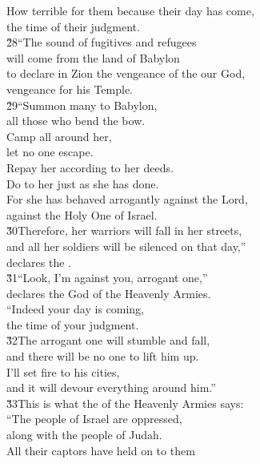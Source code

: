 \begin{poetry}
\poeml How terrible for them because their day has come, \\
\poemll    the time of their judgment. \\
\poeml \v{28}``The sound of fugitives and refugees \\
\poemll    will come from the land of Babylon \\
\poeml to declare in Zion the vengeance of the  our God, \\
\poemll    vengeance for his Temple. \\
\poeml \v{29}``Summon many to Babylon, \\
\poemll    all those who bend the bow. \\
\poeml Camp all around her, \\
\poemll    let no one escape. \\
\poeml Repay her according to her deeds. \\
\poemll    Do to her just as she has done. \\
\poeml For she has behaved arrogantly against the Lord, \\
\poemll    against the Holy One of Israel. \\
\poeml \v{30}Therefore, her warriors will fall in her streets, \\
\poemll    and all her soldiers will be silenced on that day,'' \\
\poemlll       declares the . \\
\poeml \v{31}``Look, I'm against you, arrogant one,'' \\
\poemll    declares the  God of the Heavenly Armies. \\
\poeml ``Indeed your day is coming, \\
\poemll    the time of your judgment. \\
\poeml \v{32}The arrogant one will stumble and fall, \\
\poemll    and there will be no one to lift him up. \\
\poeml I'll set fire to his cities, \\
\poemll    and it will devour everything around him.'' \\
\poeml \v{33}This is what the  of the Heavenly Armies says: \\
\poeml ``The people of Israel are oppressed, \\
\poemll    along with the people of Judah. \\
\poeml All their captors have held on to them \\

\end{poetry}
